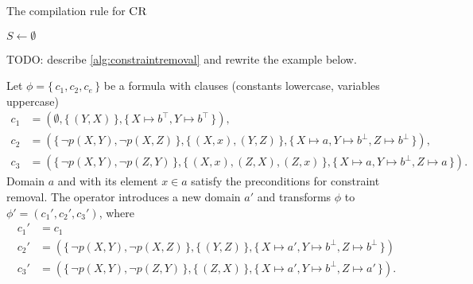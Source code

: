 \begin{algorithm}[t]
  \caption{The compilation rule for $\operatorname{\textsc{CR}}$}
  \label{alg:constraintremoval}
  $S \gets \emptyset$\;
\end{algorithm}

TODO: describe \cref{alg:constraintremoval} and rewrite the example below.

\begin{example}
  Let $\phi = \{\, c_1, c_2, c_e \,\}$ be a formula with clauses (constants lowercase, variables uppercase)
  \begin{align*}
    c_1 &= (\emptyset, \{\, (Y, X) \,\}, \{\, X \mapsto b^\top, Y \mapsto b^\top \,\}), \\
    c_2 &= (\{\, \neg p(X, Y), \neg p(X, Z) \,\}, \{\, (X, x), (Y, Z) \,\}, \{\, X \mapsto a, Y \mapsto b^\bot, Z \mapsto b^\bot \,\}), \\
    c_3 &= (\{\, \neg p(X, Y), \neg p(Z, Y) \,\}, \{\, (X, x), (Z, X), (Z, x) \,\}, \{\, X \mapsto a, Y \mapsto b^\bot, Z \mapsto a \,\}).
  \end{align*}
  Domain $a$ and with its element $x \in a$ satisfy the preconditions for constraint removal. The operator introduces a new domain $a'$ and transforms $\phi$ to $\phi' = (c_1', c_2', c_3')$, where
  \begin{align*}
    c_1' &= c_1 \\
    c_2' &= (\{\, \neg p(X, Y), \neg p(X, Z) \,\}, \{\, (Y, Z) \,\}, \{\, X \mapsto a', Y \mapsto b^\bot, Z \mapsto b^\bot \,\}) \\
    c_3' &= (\{\, \neg p(X, Y), \neg p(Z, Y) \,\}, \{\, (Z, X) \,\}, \{\, X \mapsto a', Y \mapsto b^\bot, Z \mapsto a' \,\}).
  \end{align*}
\end{example}

